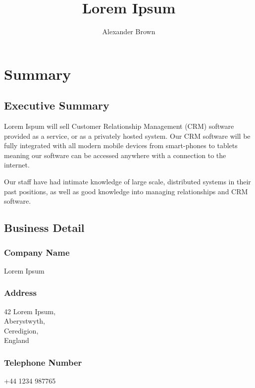 \documentclass[DIV=calc, paper=a4, fontsize=11pt]{scrartcl}	 %
\title{Lorem Ipsum} %
\author{Alexander Brown } %
\date{} %
\begin{document}
\maketitle %

\thispagestyle{fancy} %

\tableofcontents
\newpage


\section{Summary}

\subsection{Executive Summary}
Lorem Ispum will sell Customer Relationship Management (CRM) software provided as a service, or
as a privately hosted system. Our CRM software will be fully integrated with all modern mobile
devices from smart-phones to tablets meaning our software can be accessed anywhere with a 
connection to the internet.

Our staff have had intimate knowledge of large scale, distributed systems in their past positions,
as well as good knowledge into managing relationships and CRM software.

\subsection{Business Detail}
\subsubsection*{Company Name}
Lorem Ipsum

\subsubsection*{Address}
42 Lorem Ipsum,\\
Aberystwyth,\\
Ceredigion,\\
England

\subsubsection*{Telephone Number}
+44 1234 987765
\end{document}

